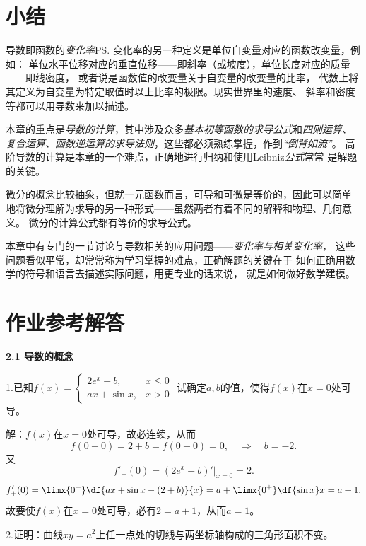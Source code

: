 \section{小结}

导数即函数的{\it 变化率}\ps{变化率的另一种定义是单位自变量对应的函数改变量，例如：
单位水平位移对应的垂直位移——即斜率（或坡度），单位长度对应的质量——即线密度}，
或者说是函数值的改变量关于自变量的改变量的比率，
代数上将其定义为自变量为特定取值时以上比率的极限。现实世界里的速度、
斜率和密度等都可以用导数来加以描述。

本章的重点是{\it 导数的计算}，其中涉及众多{\it 基本初等函数的求导公式}和{\it 四则运算、
复合运算、函数逆运算的求导法则}，这些都必须熟练掌握，作到{\it “倒背如流”}。
高阶导数的计算是本章的一个难点，正确地进行归纳和使用Leibniz{\it 公式}常常
是解题的关键。

微分的概念比较抽象，但就一元函数而言，可导和可微是等价的，因此可以简单
地将微分理解为求导的另一种形式——虽然两者有着不同的解释和物理、几何意义。
微分的计算公式都有等价的求导公式。

本章中有专门的一节讨论与导数相关的应用问题——{\it 变化率与相关变化率}，
这些问题看似平常，却常常称为学习掌握的难点，正确解题的关键在于
如何正确用数学的符号和语言去描述实际问题，用更专业的话来说，
就是如何做好数学建模。

\newpage

\ifanswer
\section*{作业参考解答}

\begin{center}
	\bf 2.1 导数的概念
\end{center}

\bigskip

1.已知$f(x)=\left\{\begin{array}{ll}
2e^x+b,& x\leq0\\ ax+\sin x,& x> 0
\end{array}\right.$
试确定$a,b$的值，使得$f(x)$在$x=0$处可导。

解：$f(x)$在$x=0$处可导，故必连续，从而
$$f(0-0)=2+b=f(0+0)=0,\quad\Rightarrow \quad b=-2.$$
又
$$f'_-(0)=(2e^x+b)'|_{x=0}=2.$$
$$f'_+(0)=\limx{0^+}\df{ax+\sin x-(2+b)}{x}
=a+\limx{0^+}\df{\sin x}x=a+1.$$
故要使$f(x)$在$x=0$处可导，必有$2=a+1$，从而$a=1$。
\fin

\bigskip

2.证明：曲线$xy=a^2$上任一点处的切线与两坐标轴构成的三角形面积不变。

